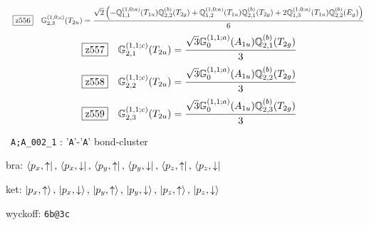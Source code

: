 \documentclass[fleqn,10pt,landscape]{jsarticle}
\begin{document}
\begin{dmath*}
\hspace*{3mm}\fbox{z556}\quad \mathbb{G}_{2,3}^{(1,0;c)}(T_{2u})=\frac{\sqrt{2} \left(- \mathbb{Q}_{1,1}^{(1,0;a)}(T_{1u}) \mathbb{Q}_{2,2}^{(b)}(T_{2g}) + \mathbb{Q}_{1,2}^{(1,0;a)}(T_{1u}) \mathbb{Q}_{2,1}^{(b)}(T_{2g}) + 2 \mathbb{Q}_{1,3}^{(1,0;a)}(T_{1u}) \mathbb{Q}_{2,2}^{(b)}(E_{g})\right)}{6}
\end{dmath*}
\begin{dmath*}
\hspace*{3mm}\fbox{z557}\quad \mathbb{G}_{2,1}^{(1,1;c)}(T_{2u})=\frac{\sqrt{3} \mathbb{G}_{0}^{(1,1;a)}(A_{1u}) \mathbb{Q}_{2,1}^{(b)}(T_{2g})}{3}
\end{dmath*}
\begin{dmath*}
\hspace*{3mm}\fbox{z558}\quad \mathbb{G}_{2,2}^{(1,1;c)}(T_{2u})=\frac{\sqrt{3} \mathbb{G}_{0}^{(1,1;a)}(A_{1u}) \mathbb{Q}_{2,2}^{(b)}(T_{2g})}{3}
\end{dmath*}
\begin{dmath*}
\hspace*{3mm}\fbox{z559}\quad \mathbb{G}_{2,3}^{(1,1;c)}(T_{2u})=\frac{\sqrt{3} \mathbb{G}_{0}^{(1,1;a)}(A_{1u}) \mathbb{Q}_{2,3}^{(b)}(T_{2g})}{3}
\end{dmath*}
\vspace{5mm}

\noindent\textbullet\, \texttt{A;A_002_1} : '\texttt{A}'-'\texttt{A}' bond-cluster

\noindent\quad * bra: $\bra{p_{x},\uparrow},\, \bra{p_{x},\downarrow},\, \bra{p_{y},\uparrow},\, \bra{p_{y},\downarrow},\, \bra{p_{z},\uparrow},\, \bra{p_{z},\downarrow}$

\noindent\quad * ket: $\ket{p_{x},\uparrow},\, \ket{p_{x},\downarrow},\, \ket{p_{y},\uparrow},\, \ket{p_{y},\downarrow},\, \ket{p_{z},\uparrow},\, \ket{p_{z},\downarrow}$

\noindent\quad * wyckoff: \texttt{6b@3c}
\end{document}
